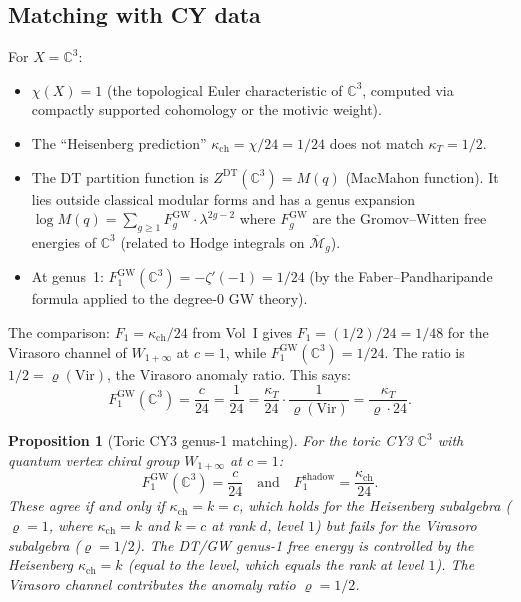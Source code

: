 \documentclass[11pt]{article}
\newtheorem{proposition}[theorem]{Proposition}
\theoremstyle{definition}
\theoremstyle{remark}
\newcommand{\Mbar}{\overline{\mathcal{M}}}
\begin{document}
\subsection{Matching with CY data}

For $X = \mathbb{C}^3$:
\begin{itemize}
\item $\chi(X) = 1$ (the topological Euler characteristic of
 $\mathbb{C}^3$, computed via compactly supported cohomology or the
 motivic weight).
\item The ``Heisenberg prediction'' $\kappa_{\mathrm{ch}} = \chi/24 = 1/24$ does not
 match $\kappa_T = 1/2$.
\item The DT partition function is $Z^{\mathrm{DT}}(\mathbb{C}^3) = M(q)$
 (MacMahon function). It lies outside classical modular forms and has a
 genus expansion
 $\log M(q) = \sum_{g \geq 1} F_g^{\mathrm{GW}} \cdot
 \lambda^{2g-2}$ where $F_g^{\mathrm{GW}}$ are the
 Gromov--Witten free energies of $\mathbb{C}^3$ (related to Hodge
 integrals on $\Mbar_g$).
\item At genus~1: $F_1^{\mathrm{GW}}(\mathbb{C}^3) = -\zeta'(-1)
 = 1/24$ (by the Faber--Pandharipande formula applied to the
 degree-0 GW theory).
\end{itemize}

The comparison: $F_1 = \kappa_{\mathrm{ch}}/24$ from Vol~I gives
$F_1 = (1/2)/24 = 1/48$ for the Virasoro channel of $W_{1+\infty}$
at $c = 1$, while $F_1^{\mathrm{GW}}(\mathbb{C}^3) = 1/24$. The
ratio is $1/2 = \varrho(\mathrm{Vir})$, the Virasoro anomaly ratio.
This says:
\begin{equation}\label{eq:toric-matching}
 F_1^{\mathrm{GW}}(\mathbb{C}^3)
 = \frac{c}{24}
 = \frac{1}{24}
 = \frac{\kappa_T}{24} \cdot \frac{1}{\varrho(\mathrm{Vir})}
 = \frac{\kappa_T}{\varrho \cdot 24}.
\end{equation}

\begin{proposition}[Toric CY3 genus-1 matching]
\label{prop:toric-genus1}
For the toric CY3 $\mathbb{C}^3$ with quantum vertex chiral group
$W_{1+\infty}$ at $c = 1$:
\[
 F_1^{\mathrm{GW}}(\mathbb{C}^3) = \frac{c}{24}
 \quad\text{and}\quad
 F_1^{\mathrm{shadow}} = \frac{\kappa_{\mathrm{ch}}}{24}.
\]
These agree if and only if $\kappa_{\mathrm{ch}} = k = c$, which holds for the Heisenberg
subalgebra ($\varrho = 1$, where $\kappa_{\mathrm{ch}} = k$ and $k = c$ at rank $d$, level $1$) but fails for the Virasoro subalgebra
($\varrho = 1/2$). The DT/GW genus-1 free energy is controlled by the
Heisenberg $\kappa_{\mathrm{ch}} = k$ (equal to the level, which equals
the rank at level $1$). The Virasoro channel contributes the anomaly
ratio $\varrho=1/2$.
\end{proposition}
\end{document}
